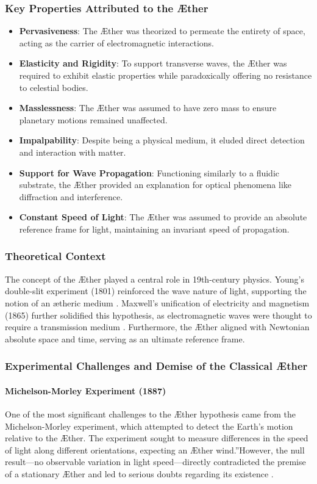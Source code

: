     \subsubsection*{Key Properties Attributed to the Æther}
    \begin{itemize}
        \item \textbf{Pervasiveness}: The Æther was theorized to permeate the entirety of space, acting as the carrier of electromagnetic interactions.
        \item \textbf{Elasticity and Rigidity}: To support transverse waves, the Æther was required to exhibit elastic properties while paradoxically offering no resistance to celestial bodies.
        \item \textbf{Masslessness}: The Æther was assumed to have zero mass to ensure planetary motions remained unaffected.
        \item \textbf{Impalpability}: Despite being a physical medium, it eluded direct detection and interaction with matter.
        \item \textbf{Support for Wave Propagation}: Functioning similarly to a fluidic substrate, the Æther provided an explanation for optical phenomena like diffraction and interference.
        \item \textbf{Constant Speed of Light}: The Æther was assumed to provide an absolute reference frame for light, maintaining an invariant speed of propagation.
    \end{itemize}

    \subsubsection*{Theoretical Context}
    The concept of the Æther played a central role in 19th-century physics. Young's double-slit experiment (1801) reinforced the wave nature of light, supporting the notion of an ætheric medium \cite{young1801}. Maxwell's unification of electricity and magnetism (1865) further solidified this hypothesis, as electromagnetic waves were thought to require a transmission medium \cite{maxwell1865}. Furthermore, the Æther aligned with Newtonian absolute space and time, serving as an ultimate reference frame.

    \subsubsection*{Experimental Challenges and Demise of the Classical Æther}
    \paragraph*{Michelson-Morley Experiment (1887)}
    One of the most significant challenges to the Æther hypothesis came from the Michelson-Morley experiment, which attempted to detect the Earth's motion relative to the Æther. The experiment sought to measure differences in the speed of light along different orientations, expecting an \grqq Æther wind.\textquotedblright However, the null result—no observable variation in light speed—directly contradicted the premise of a stationary Æther and led to serious doubts regarding its existence \cite{michelson1887}.

